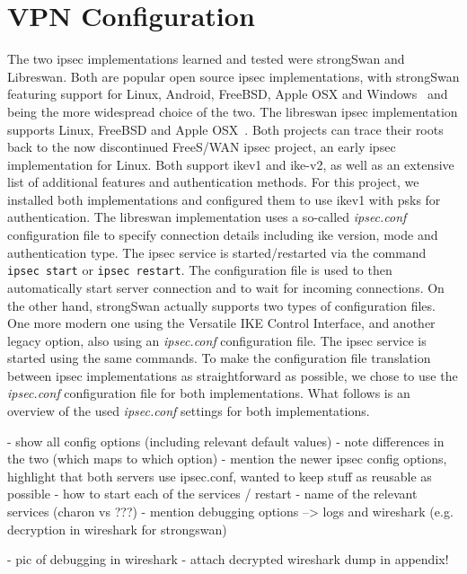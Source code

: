 \section{VPN Configuration} \label{sec:vpn_setup}
The two \ac{ipsec} implementations learned and tested were strongSwan and Libreswan. Both are popular open source \ac{ipsec} implementations, with strongSwan featuring support for Linux, Android, FreeBSD, Apple OSX and Windows~\cite{doc:strongswan} and being the more widespread choice of the two. The libreswan \ac{ipsec} implementation supports Linux, FreeBSD and Apple OSX~\cite{doc:libreswan}. Both projects can trace their roots back to the now discontinued FreeS/WAN \ac{ipsec} project, an early \ac{ipsec} implementation for Linux. Both support \ac{ike}v1 and \ac{ike}-v2, as well as an extensive list of additional features and authentication methods. For this project, we installed both implementations and configured them to use \ac{ike}v1 with \acp{psk} for authentication. The libreswan implementation uses a so-called \emph{ipsec.conf} configuration file to specify connection details including \ac{ike} version, mode and authentication type. The \ac{ipsec} service is started/restarted via the command \texttt{ipsec start} or \texttt{ipsec restart}. The configuration file is used to then automatically start server connection and to wait for incoming connections. On the other hand, strongSwan actually supports two types of configuration files. One more modern one using the Versatile IKE Control Interface, and another legacy option, also using an \emph{ipsec.conf} configuration file. The \ac{ipsec} service is started using the same commands. To make the configuration file translation between \ac{ipsec} implementations as straightforward as possible, we chose to use the \emph{ipsec.conf} configuration file for both implementations. What follows is an overview of the used \emph{ipsec.conf} settings for both implementations.





- show all config options (including relevant default values)
- note differences in the two (which maps to which option)
	- mention the newer ipsec config options, highlight that both servers use ipsec.conf, wanted to keep stuff as reusable as possible
- how to start each of the services / restart
- name of the relevant services (charon vs ???)
- mention debugging options --> logs and wireshark (e.g. decryption in wireshark for strongswan)

- pic of debugging in wireshark
- attach decrypted wireshark dump in appendix!


